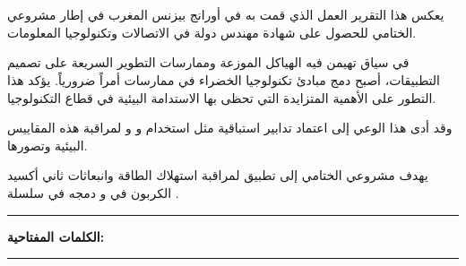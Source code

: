 \chapter*{}

\begin{RLtext}
يعكس هذا التقرير العمل الذي قمت به في أورانج بيزنس المغرب في إطار مشروعي الختامي للحصول على شهادة مهندس دولة في الاتصالات وتكنولوجيا المعلومات.

 في سياق تهيمن فيه الهياكل الموزعة وممارسات التطوير السريعة على تصميم التطبيقات، أصبح دمج مبادئ تكنولوجيا الخضراء في ممارسات  أمراً ضرورياً. يؤكد هذا التطور على الأهمية المتزايدة التي تحظى بها الاستدامة البيئية في قطاع التكنولوجيا.
  
 وقد أدى هذا الوعي إلى اعتماد تدابير استباقية مثل استخدام  و  و  لمراقبة هذه المقاييس البيئية وتصورها.
 
 يهدف مشروعي الختامي إلى تطبيق  لمراقبة استهلاك الطاقة وانبعاثات ثاني أكسيد الكربون في  و دمجه في سلسلة .
\end{RLtext}

\noindent\rule[2pt]{\textwidth}{0.5pt}

\begin{RLtext} 

{\textbf{الكلمات المفتاحية:}} 
\\

\end{RLtext}

\noindent\rule[2pt]{\textwidth}{0.5pt}
